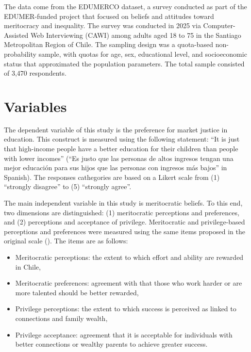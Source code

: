 \documentclass[
  spanish,
  a4paper,
  oneside]{scrbook}
\providecommand{\tightlist}{%
  \setlength{\itemsep}{0pt}\setlength{\parskip}{0pt}}
\begin{document}
The data come from the EDUMERCO dataset, a survey conducted as part of
the EDUMER-funded project that focused on beliefs and attitudes toward
meritocracy and inequality. The survey was conducted in 2025 via
Computer-Assisted Web Interviewing (CAWI) among adults aged 18 to 75 in
the Santiago Metropolitan Region of Chile. The sampling design was a
quota-based non-probability sample, with quotas for age, sex,
educational level, and socioeconomic status that approximated the
population parameters. The total sample consisted of 3,470 respondents.

\section{Variables}\label{variables}

The dependent variable of this study is the preference for market
justice in education. This construct is measured using the following
statement: ``It is just that high-income people have a better education
for their children than people with lower incomes'' (``Es justo que las
personas de altos ingresos tengan una mejor educación para sus hijos que
las personas con ingresos más bajos'' in Spanish). The responses
cathegories are based on a Likert scale from (1) ``strongly disagree''
to (5) ``strongly agree''.

The main independent variable in this study is meritocratic beliefs. To
this end, two dimensions are distinguished: (1) meritocratic perceptions
and preferences, and (2) perceptions and acceptance of privilege.
Meritocratic and privilege-based perceptions and preferences were
measured using the same items proposed in the original scale
().
The items are as follows:

\begin{itemize}
\tightlist
\item
  Meritocratic perceptions: the extent to which effort and ability are
  rewarded in Chile,
\item
  Meritocratic preferences: agreement with that those who work harder or
  are more talented should be better rewarded,
\item
  Privilege perceptions: the extent to which success is perceived as
  linked to connections and family wealth,
\item
  Privilege acceptance: agreement that it is acceptable for individuals
  with better connections or wealthy parents to achieve greater success.
\end{itemize}
\end{document}
